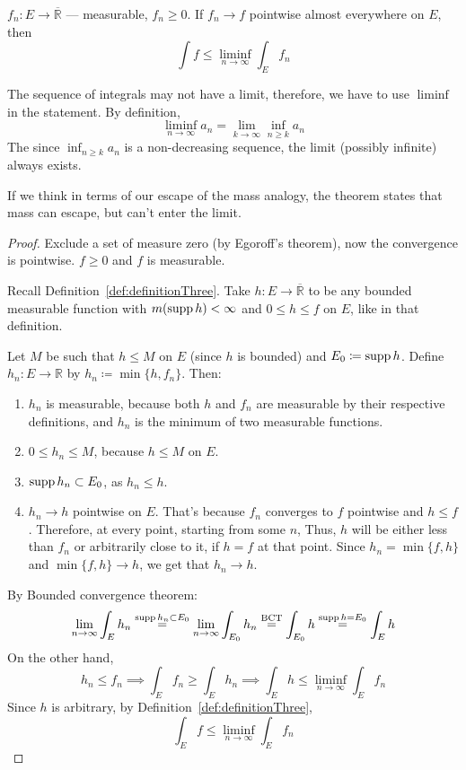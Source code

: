\begin{lemma}
    $f_n : E \to \overline{\mathbb{R}}$ --- measurable, $f_n \ge 0$.
    If $f_n \to f$ pointwise almost everywhere on $E$, then
    \[
        \int f \le \liminf_{n \to \infty} \int_E f_n 
    \]
\end{lemma}
\begin{remark}
    The sequence of integrals may not have a limit, therefore, we have to use
    $\liminf$ in the statement. By definition,
    \[ \liminf_{n \to \infty} a_n = \lim_{k \to \infty} \inf_{n \ge k} a_n \]
    The since $\inf_{n \ge k} a_n$ is a non-decreasing sequence, the limit
    (possibly infinite) always exists.
\end{remark}
\begin{remark}
    If we think in terms of our escape of the mass analogy, the theorem states that mass can escape,
    but can't enter the limit.
\end{remark}
\begin{proof}
    Exclude a set of measure zero (by Egoroff's theorem), now the convergence is pointwise.
    $f \ge 0$ and $f$ is measurable.

    Recall Definition~\ref{def:definitionThree}.
    Take $h : E \to \overline{\mathbb{R}}$ to be any bounded measurable function with 
    $m(\operatorname{supp} h) < \infty$ and $0 \le h \le f$ on $E$, like in that definition.

    Let $M$ be such that $h \le M$ on $E$ (since $h$ is bounded) and $E_0 \coloneqq \operatorname{supp} h$.
    Define $h_n : E \to \mathbb{R}$ by $h_n \coloneqq \min\{h, f_n\}$. Then:
    \begin{enumerate}
        \item {
            $h_n$ is measurable, because both $h$ and $f_n$ are measurable by their
            respective definitions, and $h_n$ is the minimum of two measurable functions.
        }
        \item {
            $0 \le h_n \le M$, because $h \le M$ on $E$.
        }
        \item {
            $\operatorname{supp} h_n \subset E_0$, as $h_n \le h$.
        }
        \item {
            $h_n \to h$ pointwise on $E$. That's because $f_n$ converges to $f$ pointwise
            and $h \le f$. Therefore, at every point, starting from some $n$, 
            Thus, $h$ will be either less than $f_n$ or arbitrarily close to it, if
            $h = f$ at that point. Since $h_n = \min\{f, h\}$ and 
            $\min\{f, h\} \to h$, we get that $h_n \to h$.
        }
    \end{enumerate}
    By Bounded convergence theorem:
    \[ 
        \lim_{n \to \infty} \int_E h_n 
        \overset{\operatorname{supp} h_n \subset E_0}{=} \lim_{n \to \infty} \int_{E_0} h_n
        \overset{\text{BCT}}{=}
        \int_{E_0} h \overset{\operatorname{supp} h = E_0}{=} \int_E h
    \]
    On the other hand,
    \[
        h_n \le f_n \implies \int_E f_n \ge \int_E h_n \implies
        \int_E h \le \liminf_{n \to \infty} \int_E f_n
    \]
    Since $h$ is arbitrary, by Definition~\ref{def:definitionThree},
    \[
        \int_E f \le \liminf_{n \to \infty} \int_E f_n
    \]
\end{proof}


